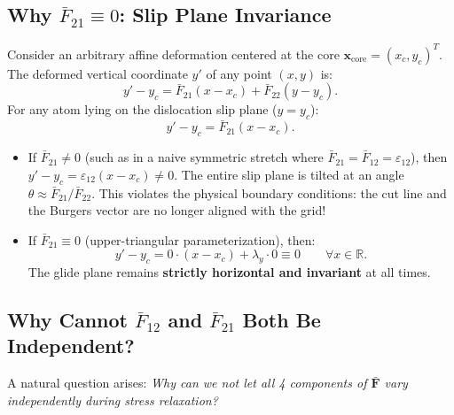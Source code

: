 \documentclass[11pt,a4paper]{article}
\begin{document}
\subsection{Why \texorpdfstring{$\bar{F}_{21} \equiv 0$}{F\_21 = 0}: Slip Plane Invariance}

Consider an arbitrary affine deformation centered at the core $\mathbf{x}_{\text{core}} = (x_c, y_c)^T$. The deformed vertical coordinate $y'$ of any point $(x, y)$ is:
\begin{equation}
y' - y_c = \bar{F}_{21}(x - x_c) + \bar{F}_{22}(y - y_c).
\end{equation}
For any atom lying on the dislocation slip plane ($y = y_c$):
\begin{equation}
y' - y_c = \bar{F}_{21}(x - x_c).
\end{equation}
\begin{itemize}
    \item If $\bar{F}_{21} \ne 0$ (such as in a naive symmetric stretch where $\bar{F}_{21} = \bar{F}_{12} = \varepsilon_{12}$), then $y' - y_c = \varepsilon_{12}(x - x_c) \ne 0$. The entire slip plane is tilted at an angle $\theta \approx \bar{F}_{21} / \bar{F}_{22}$. This violates the physical boundary conditions: the cut line and the Burgers vector are no longer aligned with the grid!
    \item If $\bar{F}_{21} \equiv 0$ (upper-triangular parameterization), then:
    \begin{equation}
    y' - y_c = 0 \cdot (x - x_c) + \lambda_y \cdot 0 \equiv 0 \qquad \forall x \in \mathbb{R}.
    \end{equation}
    The glide plane remains \textbf{strictly horizontal and invariant} at all times.
\end{itemize}

\subsection{Why Cannot \texorpdfstring{$\bar{F}_{12}$}{F\_12} and \texorpdfstring{$\bar{F}_{21}$}{F\_21} Both Be Independent?}

A natural question arises: \emph{Why can we not let all 4 components of $\bar{\mathbf{F}}$ vary independently during stress relaxation?}
\end{document}
